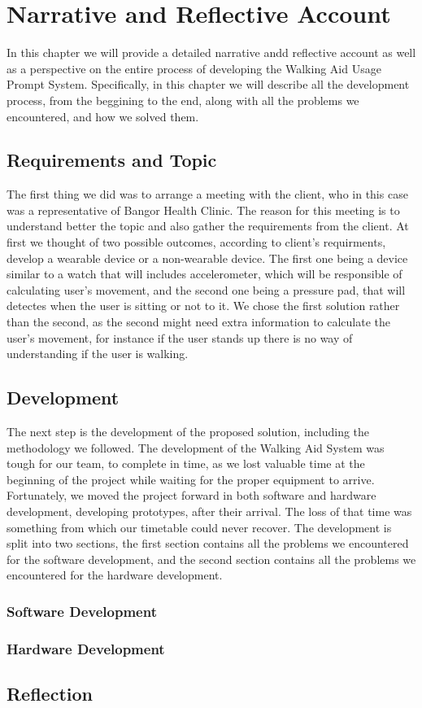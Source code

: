 \chapter{Narrative and Reflective Account}
\label{ch:narrative}

    In this chapter we will provide a detailed narrative andd reflective account as well as a perspective on the entire process of developing the Walking Aid Usage Prompt System. Specifically, in this chapter we will describe all the development process, from the beggining to the end, along with all the problems we encountered, and how we solved them.

    \section{Requirements and Topic}
    \label{sec:reqs}

    The first thing we did was to arrange a meeting with the client, who in this case was a representative of Bangor Health Clinic. The reason for this meeting is to understand better the topic and also gather the requirements from the client. At first we thought of two possible outcomes, according to client's requirments, develop a wearable device or a non-wearable device. The first one being a device similar to a watch that will includes accelerometer, which will be responsible of calculating user's movement, and the second one being a pressure pad, that will detectes when the user is sitting or not to it. We chose the first solution rather than the second, as the second might need extra information to calculate the user's movement, for instance if the user stands up there is no way of understanding if the user is walking.

    \section{Development}
    \label{sec:development}

    The next step is the development of the proposed solution, including the methodology we followed. The development of the Walking Aid System was tough for our team, to complete in time, as we lost valuable time at the beginning of the project while waiting for the proper equipment to arrive. Fortunately, we moved the project forward in both software and hardware development, developing prototypes, after their arrival. The loss of that time was something from which our timetable could never recover. The development is split into two sections, the first section contains all the problems we encountered for the software development, and the second section contains all the problems we encountered for the hardware development.

    \subsection{Software Development}
    \label{sec:software}


    \subsection{Hardware Development}
    \label{sec:hardware}


    \section{Reflection}
    \label{sec:Reflection}
